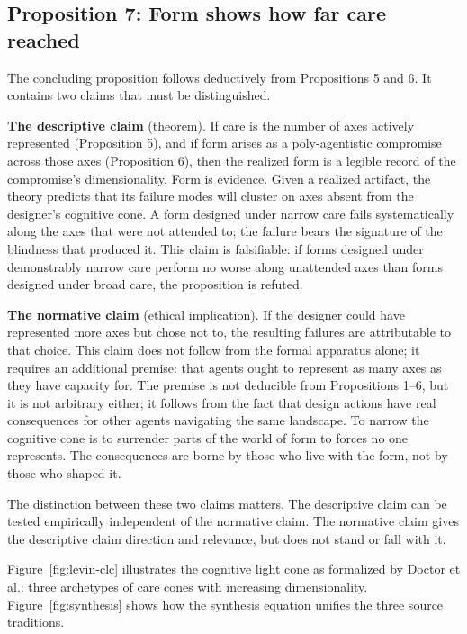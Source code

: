 \subsection{Proposition 7: Form shows how far care reached}
\label{sec:prop7}

The concluding proposition follows deductively from Propositions 5 and 6. It contains two claims that must be distinguished.

\textbf{The descriptive claim} (theorem). If care is the number of axes actively represented (Proposition 5), and if form arises as a poly-agentistic compromise across those axes (Proposition 6), then the realized form is a legible record of the compromise's dimensionality. Form is evidence. Given a realized artifact, the theory predicts that its failure modes will cluster on axes absent from the designer's cognitive cone. A form designed under narrow care fails systematically along the axes that were not attended to; the failure bears the signature of the blindness that produced it. This claim is falsifiable: if forms designed under demonstrably narrow care perform no worse along unattended axes than forms designed under broad care, the proposition is refuted.

\textbf{The normative claim} (ethical implication). If the designer could have represented more axes but chose not to, the resulting failures are attributable to that choice. This claim does not follow from the formal apparatus alone; it requires an additional premise: that agents ought to represent as many axes as they have capacity for. The premise is not deducible from Propositions 1--6, but it is not arbitrary either; it follows from the fact that design actions have real consequences for other agents navigating the same landscape. To narrow the cognitive cone is to surrender parts of the world of form to forces no one represents. The consequences are borne by those who live with the form, not by those who shaped it.

The distinction between these two claims matters. The descriptive claim can be tested empirically independent of the normative claim. The normative claim gives the descriptive claim direction and relevance, but does not stand or fall with it.

Figure~\ref{fig:levin-clc} illustrates the cognitive light cone as formalized by Doctor et al.: three archetypes of care cones with increasing dimensionality. Figure~\ref{fig:synthesis} shows how the synthesis equation unifies the three source traditions.

